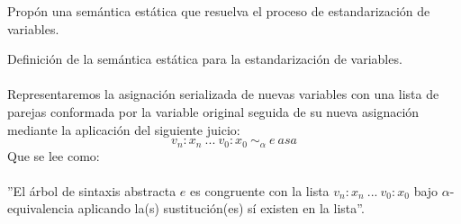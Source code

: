         \begin{exercise} 
	Propón una semántica estática que resuelva el proceso de estandarización de variables.
    \end{exercise}
	\begin{definition} Definición de la semántica estática para la estandarización de variables.\\\\
	Representaremos la asignación serializada de nuevas variables con una lista de parejas conformada por la variable original seguida de su nueva asignación mediante la aplicación del siguiente juicio: $$v_n:x_n\ ...\ v_0:x_0\ \sim_{\alpha}\ e\ asa$$ 
          Que se lee como: \\\\
	''El árbol de sintaxis abstracta $e$ es congruente con la lista $v_n: x_n\ ...\ v_0:x_0$ bajo $\alpha$-equivalencia aplicando la(s) sustitución(es) sí existen en la lista''.\\


\end{definition}
